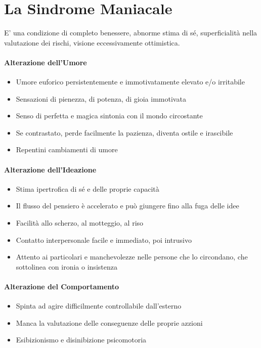 
\section{La Sindrome Maniacale}
E' una condizione di completo benessere, abnorme stima di sé, superficialità nella valutazione dei rischi, visione eccessivamente ottimistica.
\paragraph{Alterazione dell'Umore}  
\begin{itemize}
	\item Umore euforico persistentemente e immotivatamente elevato e/o irritabile
	\item Sensazioni di pienezza, di potenza, di gioia immotivata
	\item Senso di perfetta e magica sintonia con il mondo circostante
	\item Se contrastato, perde facilmente la pazienza, diventa ostile e irascibile
	\item Repentini cambiamenti di umore
\end{itemize}
\paragraph{Alterazione dell'Ideazione}  
\begin{itemize}
	\item Stima ipertrofica di sé e delle proprie capacità
	\item Il flusso del pensiero è accelerato e può giungere fino alla fuga delle idee
	\item Facilità allo scherzo, al motteggio, al riso
	\item Contatto interpersonale facile e immediato, poi intrusivo
	\item Attento ai particolari e manchevolezze nelle persone che lo circondano, che sottolinea con ironia o insistenza
\end{itemize}
\paragraph{Alterazione del Comportamento}  
\begin{itemize}
	\item Spinta ad agire difficilmente controllabile dall'esterno
	\item Manca la valutazione delle conseguenze delle proprie azzioni
	\item Esibizionismo e disinibizione psicomotoria
\end{itemize}

